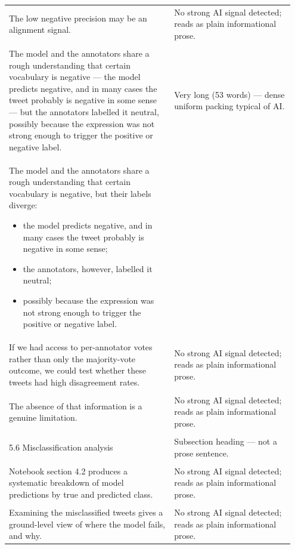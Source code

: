 \documentclass[11pt]{article}
\begin{document}
\begin{longtable}{|p{0.55\linewidth}|p{0.40\linewidth}|}
\hline
\rule{0pt}{3.5cm} & \\
\hline
The low negative precision may be an alignment signal. & No strong AI signal detected; reads as plain informational prose. \\[2pt]
\hline
\rule{0pt}{3.5cm} & \\
\hline
The model and the annotators share a rough understanding that certain vocabulary is negative --- the model predicts negative, and in many cases the tweet probably is negative in some sense --- but the annotators labelled it neutral, possibly because the expression was not strong enough to trigger the positive or negative label. & Very long (53 words) --- dense uniform packing typical of AI. \\[2pt]
\hline
The model and the annotators share a rough understanding that certain vocabulary is negative, but their labels diverge:
\begin{itemize}[leftmargin=*,topsep=2pt,itemsep=1pt,parsep=0pt]
  \item the model predicts negative, and in many cases the tweet probably is negative in some sense;
  \item the annotators, however, labelled it neutral;
  \item possibly because the expression was not strong enough to trigger the positive or negative label.
\end{itemize} & \\
\hline
If we had access to per-annotator votes rather than only the majority-vote outcome, we could test whether these tweets had high disagreement rates. & No strong AI signal detected; reads as plain informational prose. \\[2pt]
\hline
\rule{0pt}{3.5cm} & \\
\hline
The absence of that information is a genuine limitation. & No strong AI signal detected; reads as plain informational prose. \\[2pt]
\hline
\rule{0pt}{3.5cm} & \\
\hline
5.6 Misclassification analysis & Subsection heading --- not a prose sentence. \\[2pt]
\hline
\rule{0pt}{3.5cm} & \\
\hline
Notebook section 4.2 produces a systematic breakdown of model predictions by true and predicted class. & No strong AI signal detected; reads as plain informational prose. \\[2pt]
\hline
\rule{0pt}{3.5cm} & \\
\hline
Examining the misclassified tweets gives a ground-level view of where the model fails, and why. & No strong AI signal detected; reads as plain informational prose. \\[2pt]

\end{longtable}
\end{document}

